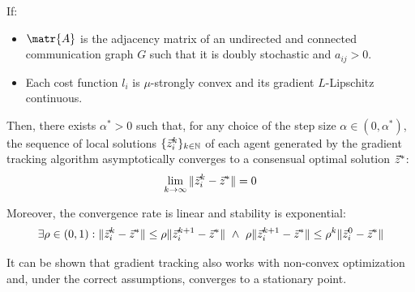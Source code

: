 \begin{description}



        \begin{theorem} 
            If:
            \begin{itemize}
                \item $\matr{A}$ is the adjacency matrix of an undirected and connected communication graph $G$ such that it is doubly stochastic and $a_{ij} > 0$.
                \item Each cost function $l_i$ is $\mu$-strongly convex and its gradient $L$-Lipschitz continuous.
            \end{itemize}
            Then, there exists $\alpha^* > 0$ such that, for any choice of the step size $\alpha \in (0, \alpha^*)$, the sequence of local solutions $\{ {\vec{z}}_i^k \}_{k \in \mathbb{N}}$ of each agent generated by the gradient tracking algorithm asymptotically converges to a consensual optimal solution ${\vec{z}}^*$:
            \[ \lim_{k \rightarrow \infty} \Vert {\vec{z}}_i^k - {\vec{z}}^* \Vert = 0 \]
            
            Moreover, the convergence rate is linear and stability is exponential:
            \[ 
                \exists \rho \in (0,1): \Vert {\vec{z}}_i^k - {\vec{z}}^* \Vert \leq \rho \Vert {\vec{z}}_i^{k+1} - {\vec{z}}^* \Vert
                \,\,\land\,\,
                \rho \Vert {\vec{z}}_i^{k+1} - {\vec{z}}^* \Vert \leq \rho^k \Vert {\vec{z}}_i^0 - {\vec{z}}^* \Vert
            \]

            \indenttbox
            \begin{remark}
                It can be shown that gradient tracking also works with non-convex optimization and, under the correct assumptions, converges to a stationary point. 
            \end{remark}
        \end{theorem}
\end{description}


